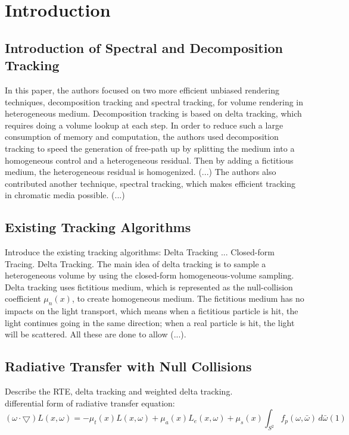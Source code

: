 
\chapter{Introduction}
\label{ch:Introduction}

\section{Introduction of Spectral and Decomposition Tracking}
In this paper, the authors focused on two more efficient unbiased rendering techniques, decomposition tracking and spectral tracking, for volume rendering in heterogeneous medium. Decomposition tracking is based on delta tracking, which requires doing a volume lookup at each step. In order to reduce such a large consumption of memory and computation, the authors used decomposition tracking to speed the generation of free-path up by splitting the medium into a homogeneous control and a heterogeneous residual. Then by adding a fictitious medium, the heterogeneous residual is homogenized. (...) The authors also contributed another technique, spectral tracking, which makes efficient tracking in chromatic media possible. (...)
\section{Existing Tracking Algorithms}
Introduce the existing tracking algorithms: Delta Tracking ...
Closed-form Tracing.
Delta Tracking. The main idea of delta tracking is to sample a heterogeneous volume by using the closed-form homogeneous-volume sampling. Delta tracking uses fictitious medium, which is represented as the null-collision coefficient $\mu_n\left(x\right)$, to create homogeneous medium. The fictitious medium has no impacts on the light transport, which means when a fictitious particle is hit, the light continues going in the same direction; when a real particle is hit, the light will be scattered. All these are done to allow (...).

\section{Radiative Transfer with Null Collisions}
Describe the RTE, delta tracking and weighted delta tracking.\\
differential form of radiative transfer equation: \[\left(\omega \cdot \bigtriangledown \right)L\left(x, \omega \right) = -\mu_t\left(x\right) L\left(x, \omega \right) + \mu_a\left(x\right) L_e\left(x, \omega \right) + \mu_s\left(x\right)  \int_{S^2} f_p\left(\omega, \bar{\omega} \right)\,d\bar{\omega}(1)\]


